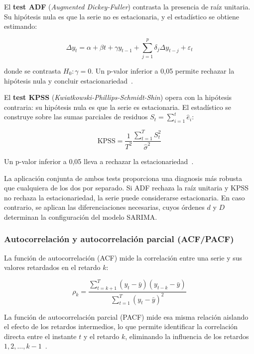 \documentclass[12pt, a4paper]{article}
\begin{document}
El \textbf{test ADF} (\textit{Augmented Dickey-Fuller}) contrasta la presencia de raíz unitaria. Su hipótesis nula es que la serie no es estacionaria, y el estadístico se obtiene estimando:

\begin{equation}
\Delta y_t = \alpha + \beta t + \gamma y_{t-1} + \sum_{j=1}^{p} \delta_j \Delta y_{t-j} + \varepsilon_t
\end{equation}

donde se contrasta $H_0: \gamma = 0$. Un p-valor inferior a 0{,}05 permite rechazar la hipótesis nula y concluir estacionariedad~\cite{hyndman2021}.

El \textbf{test KPSS} (\textit{Kwiatkowski-Phillips-Schmidt-Shin}) opera con la hipótesis contraria: su hipótesis nula es que la serie es estacionaria. El estadístico se construye sobre las sumas parciales de residuos $S_t = \sum_{i=1}^{t} \hat{e}_i$:

\begin{equation}
\text{KPSS} = \frac{1}{T^2} \frac{\sum_{t=1}^{T} S_t^2}{\hat{\sigma}^2}
\end{equation}

Un p-valor inferior a 0{,}05 lleva a rechazar la estacionariedad~\cite{hyndman2021}.

La aplicación conjunta de ambos tests proporciona una diagnosis más robusta que cualquiera de los dos por separado. Si ADF rechaza la raíz unitaria y KPSS no rechaza la estacionariedad, la serie puede considerarse estacionaria. En caso contrario, se aplican las diferenciaciones necesarias, cuyos órdenes $d$ y $D$ determinan la configuración del modelo SARIMA.

\subsubsection{Autocorrelación y autocorrelación parcial (ACF/PACF)}

La función de autocorrelación (ACF) mide la correlación entre una serie y sus valores retardados en el retardo $k$:

\begin{equation}
\rho_k = \frac{\sum_{t=k+1}^{T}(y_t - \bar{y})(y_{t-k} - \bar{y})}{\sum_{t=1}^{T}(y_t - \bar{y})^2}
\end{equation}

La función de autocorrelación parcial (PACF) mide esa misma relación aislando el efecto de los retardos intermedios, lo que permite identificar la correlación directa entre el instante $t$ y el retardo $k$, eliminando la influencia de los retardos $1, 2, \ldots, k-1$~\cite{hyndman2021}.
\end{document}
